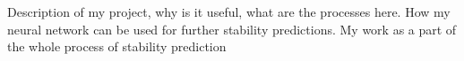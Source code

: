 Description of my project, why is it useful, what are the processes here. How my neural network can be used for further stability predictions. My work as a part of the whole process of stability prediction